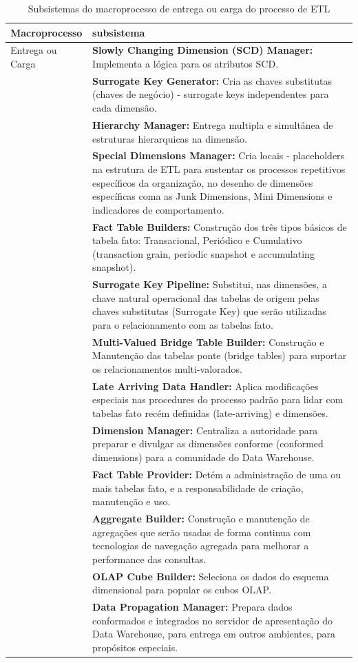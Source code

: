 \clearpage


\begin{table}[h]
	\centering
	\caption{Subsistemas do macroprocesso de entrega ou carga do processo de ETL}
	\label{subcarga}
	\begin{tabular}{|p{3cm}| p{11cm} |}
		\hline
		Macroprocesso & subsistema\\
		\hline
		Entrega ou Carga & \textbf{Slowly Changing Dimension (SCD) Manager:} Implementa a lógica para os atributos SCD. \\
		& \textbf{Surrogate Key Generator:} Cria as chaves substitutas (chaves de negócio) - surrogate keys independentes para cada dimensão.  \\
		& \textbf{Hierarchy Manager:} Entrega multipla e simultânea de estruturas hierarquicas na dimensão. \\
		& \textbf{Special Dimensions Manager:} Cria locais - placeholders na estrutura de ETL para sustentar os processos repetitivos específicos da organização, no desenho de dimensões específicas coma as Junk Dimensions, Mini Dimensions e indicadores de comportamento. \\
		& \textbf{Fact Table Builders:} Construção dos três tipos básicos de tabela fato: Transacional, Periódico e Cumulativo (transaction grain, periodic snapshot e accumulating snapshot). \\
		& \textbf{Surrogate Key Pipeline:} Substitui, nas dimensões, a chave natural operacional das tabelas de origem pelas chaves substitutas (Surrogate Key) que serão utilizadas para o relacionamento com as tabelas fato.  \\
		& \textbf{Multi-Valued Bridge Table Builder:} Construção e Manutenção das tabelas ponte (bridge tables) para suportar os relacionamentos multi-valorados. \\
		& \textbf{Late Arriving Data Handler:} Aplica modificações especiais nas procedures do processo padrão para lidar com tabelas fato recém definidas (late-arriving)  e dimensões. \\
		& \textbf{Dimension Manager:} Centraliza a autoridade para preparar e divulgar as dimensões conforme (conformed dimensions) para a comunidade do Data Warehouse.  \\
		& \textbf{Fact Table Provider:} Detém a administração de uma ou mais tabelas fato, e a responsabilidade de criação, manutenção e uso. \\
		& \textbf{Aggregate Builder:} Construção e manutenção de agregações que serão usadas de forma continua com tecnologias de navegação agregada para melhorar a  performance das consultas.  \\
		& \textbf{OLAP Cube Builder:} Seleciona os dados do esquema dimensional para popular os cubos OLAP. \\
		& \textbf{Data Propagation Manager:} Prepara dados conformados e integrados no servidor de apresentação do Data Warehouse, para entrega em outros ambientes, para propósitos especiais. \\
		\hline
		
	\end{tabular}
\end{table}

